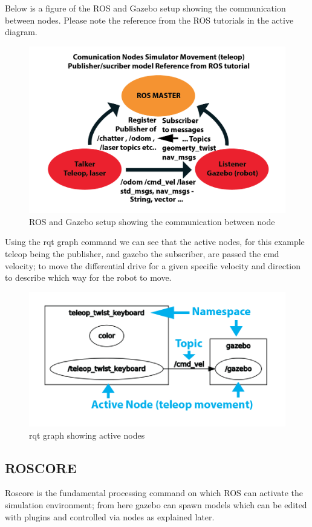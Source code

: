 \documentclass[a4paper, 10pt]{IEEEconf}
\begin{document}
Below is a figure of the ROS and Gazebo setup showing the communication between nodes. Please note the reference from the ROS tutorials in the active diagram.

\begin{figure}[H]
  \includegraphics[width=0.8\linewidth, center]{images/BlockDiagram}
  \caption{ROS and Gazebo setup showing the communication between node}
  \label{fig:ROS and Gazebo setup showing the communication between node}
\end{figure}

Using the rqt graph command we can see that the active nodes, for this example teleop being the publisher, and gazebo the subscriber, are passed the cmd velocity; to move the differential drive for a given specific velocity and direction to describe which way for the robot to move.

\begin{figure}[H]
  \includegraphics[width=0.8\linewidth, center]{images/rqtgraph}
  \caption{rqt graph showing active nodes}
  \label{fig:rqt graph showing active nodes}
\end{figure}

\clearpage
\subsection{ROSCORE}
Roscore is the fundamental processing command on which ROS can activate the simulation environment; from here gazebo can spawn models which can be edited with plugins and controlled via nodes as explained later.
\end{document}
